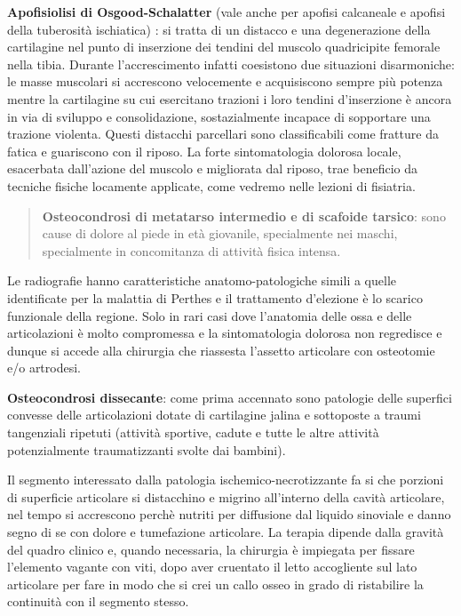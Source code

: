 \documentclass[]{article}
\begin{document}
\textbf{Apofisiolisi di Osgood-Schalatter} (vale anche per apofisi
calcaneale e apofisi della tuberosità ischiatica) : si tratta di un
distacco e una degenerazione della cartilagine nel punto di inserzione
dei tendini del muscolo quadricipite femorale nella tibia. Durante
l'accrescimento infatti coesistono due situazioni disarmoniche: le masse
muscolari si accrescono velocemente e acquisiscono sempre più potenza
mentre la cartilagine su cui esercitano trazioni i loro tendini
d'inserzione è ancora in via di sviluppo e consolidazione,
sostazialmente incapace di sopportare una trazione violenta. Questi
distacchi parcellari sono classificabili come fratture da fatica e
guariscono con il riposo. La forte sintomatologia dolorosa locale,
esacerbata dall'azione del muscolo e migliorata dal riposo, trae
beneficio da tecniche fisiche locamente applicate, come vedremo nelle
lezioni di fisiatria.

\begin{quote}
\textbf{Osteocondrosi di metatarso intermedio e di scafoide tarsico}:
sono cause di dolore al piede in età giovanile, specialmente nei maschi,
specialmente in concomitanza di attività fisica intensa.
\end{quote}

Le radiografie hanno caratteristiche anatomo-patologiche simili a quelle
identificate per la malattia di Perthes e il trattamento d'elezione è lo
scarico funzionale della regione. Solo in rari casi dove l'anatomia
delle ossa e delle articolazioni è molto compromessa e la sintomatologia
dolorosa non regredisce e dunque si accede alla chirurgia che riassesta
l'assetto articolare con osteotomie e/o artrodesi.

\textbf{Osteocondrosi dissecante}: come prima accennato sono patologie
delle superfici convesse delle articolazioni dotate di cartilagine
jalina e sottoposte a traumi tangenziali ripetuti (attività sportive,
cadute e tutte le altre attività potenzialmente traumatizzanti svolte
dai bambini).

Il segmento interessato dalla patologia ischemico-necrotizzante fa si
che porzioni di superficie articolare si distacchino e migrino
all'interno della cavità articolare, nel tempo si accrescono perchè
nutriti per diffusione dal liquido sinoviale e danno segno di se con
dolore e tumefazione articolare. La terapia dipende dalla gravità del
quadro clinico e, quando necessaria, la chirurgia è impiegata per
fissare l'elemento vagante con viti, dopo aver cruentato il letto
accogliente sul lato articolare per fare in modo che si crei un callo
osseo in grado di ristabilire la continuità con il segmento stesso.
\end{document}
